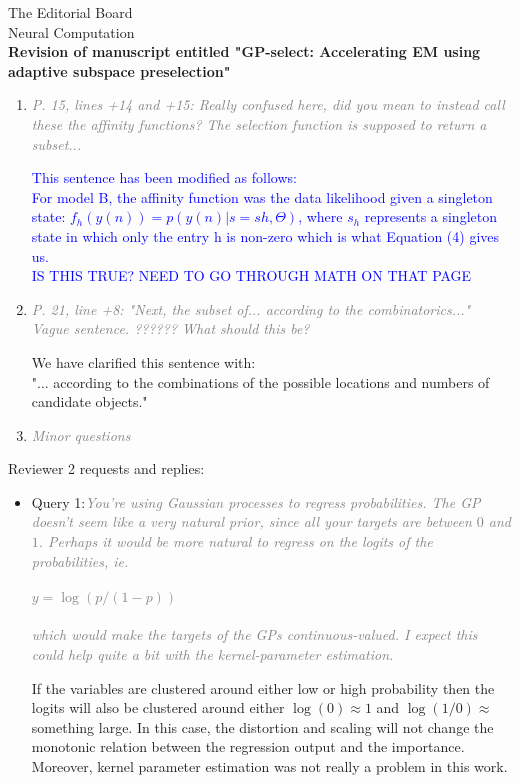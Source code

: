 \documentclass[10pt]{letter}
\newcommand{\rvr}[1]{\textcolor{gray}{#1}}
\newcommand{\rev}[1]{\textcolor{blue}{#1}}
\begin{document}
\begin{letter}{
The Editorial Board\\
Neural Computation\\
\vspace{10mm}
\textbf{Revision of manuscript entitled "GP-select: Accelerating EM using adaptive
subspace preselection"}
}
\begin{enumerate}[topsep=3pt,itemsep=2ex,partopsep=1ex,parsep=1ex]
    \rev{ADD PARAMETERS HERE AND TO SECTION 5.1}

    \item \rvr{\emph{P. 15, lines +14 and +15: Really confused here, did you mean to instead call these the affinity functions? The selection function is supposed to return a subset...}}

    \rev{This sentence has been modified as follows:\\
For model B, the affinity function was the data likelihood given a singleton state: $f_h (y (n) ) = p(y (n) |s = s h , Θ)$, where $s_h$ represents a singleton state in which only the entry h is non-zero which is what Equation (4) gives us. \\
IS THIS TRUE?  NEED TO GO THROUGH MATH ON THAT PAGE   }


    \item \rvr{\emph{P. 21, line +8: "Next, the subset of... according to the combinatorics..." Vague sentence. ??????  What should this be?}}

We have clarified this sentence with:\\
"... according to the combinations of the possible locations and numbers of candidate objects."

    
    \item \rvr{\emph{Minor questions}}

\end{enumerate}



Reviewer 2 requests and replies:

\begin{itemize}[topsep=3pt,itemsep=2ex,partopsep=1ex,parsep=1ex]

    \item Query 1:\rvr{\emph{You're using Gaussian processes to regress probabilities. The GP doesn't
seem like a very natural prior, since all your targets are between $0$ and
$1$. Perhaps it would be more natural to regress on the logits of the
probabilities, ie.\\
\\
$y = \log(p / (1-p))$\\
\\
which would make the targets of the GPs continuous-valued. I expect this
could help quite a bit with the kernel-parameter estimation.}}


    If the variables are clustered around either low or high probability then the logits will also be clustered around either $\log(0) \approx 1$ and $\log (1/0) \approx$ something large. In this case, the distortion and scaling will not change the monotonic relation between the regression output and the importance. Moreover, kernel parameter estimation was not really a problem in this work.


\end{itemize}
\end{letter}
\end{document}
